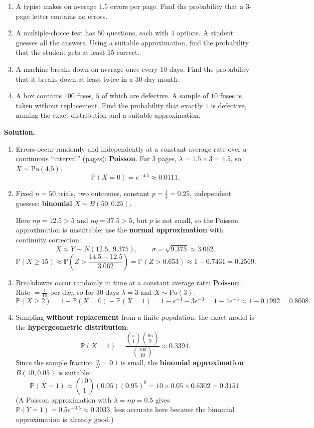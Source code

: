 \documentclass[11pt]{article}
\begin{document}
\begin{exoresolu}
\begin{enumerate}
\item A typist makes on average $1.5$ errors per page. Find the probability that a $3$-page letter contains no errors.
\item A multiple-choice test has $50$ questions, each with $4$ options. A student guesses all the answers. Using a suitable approximation, find the probability that the student gets at least $15$ correct.
\item A machine breaks down on average once every $10$ days. Find the probability that it breaks down at least twice in a $30$-day month.
\item A box contains $100$ fuses, $5$ of which are defective. A sample of $10$ fuses is taken without replacement. Find the probability that exactly $1$ is defective, naming the exact distribution and a suitable approximation.
\end{enumerate}
\tcblower
\textbf{Solution.}
\begin{enumerate}
\item Errors occur randomly and independently at a constant average rate over a continuous ``interval'' (pages): \textbf{Poisson}. For $3$ pages, $\lambda = 1.5 \times 3 = 4.5$, so $X \sim \mathrm{Po}(4.5)$.
\[
\mathbb{P}(X = 0) = e^{-4.5} \approx 0.0111.
\]
\item Fixed $n = 50$ trials, two outcomes, constant $p = \tfrac{1}{4} = 0.25$, independent guesses: \textbf{binomial} $X \sim B(50, 0.25)$.

Here $np = 12.5 > 5$ and $nq = 37.5 > 5$, but $p$ is not small, so the Poisson approximation is unsuitable; use the \textbf{normal approximation} with continuity correction:
\[
X \approx Y \sim N(12.5,\ 9.375), \qquad \sigma = \sqrt{9.375} \approx 3.062.
\]
\[
\mathbb{P}(X \ge 15) \approx \mathbb{P}\!\left(Z > \frac{14.5 - 12.5}{3.062}\right) = \mathbb{P}(Z > 0.653) \approx 1 - 0.7431 = 0.2569.
\]
\item Breakdowns occur randomly in time at a constant average rate: \textbf{Poisson}. Rate $= \tfrac{1}{10}$ per day, so for $30$ days $\lambda = 3$ and $X \sim \mathrm{Po}(3)$.
\[
\mathbb{P}(X \ge 2) = 1 - \mathbb{P}(X=0) - \mathbb{P}(X=1) = 1 - e^{-3} - 3e^{-3} = 1 - 4e^{-3} \approx 1 - 0.1992 = 0.8008.
\]
\item Sampling \textbf{without replacement} from a finite population: the exact model is the \textbf{hypergeometric distribution}:
\[
\mathbb{P}(X=1) = \frac{\binom{5}{1}\binom{95}{9}}{\binom{100}{10}} \approx 0.3394.
\]
Since the sample fraction $\tfrac{n}{N} = 0.1$ is small, the \textbf{binomial approximation} $B(10, 0.05)$ is suitable:
\[
\mathbb{P}(X=1) \approx \binom{10}{1}(0.05)(0.95)^9 = 10 \times 0.05 \times 0.6302 = 0.3151.
\]
(A Poisson approximation with $\lambda = np = 0.5$ gives $\mathbb{P}(Y=1) = 0.5e^{-0.5} \approx 0.3033$, less accurate here because the binomial approximation is already good.)
\end{enumerate}
\end{exoresolu}
\end{document}
